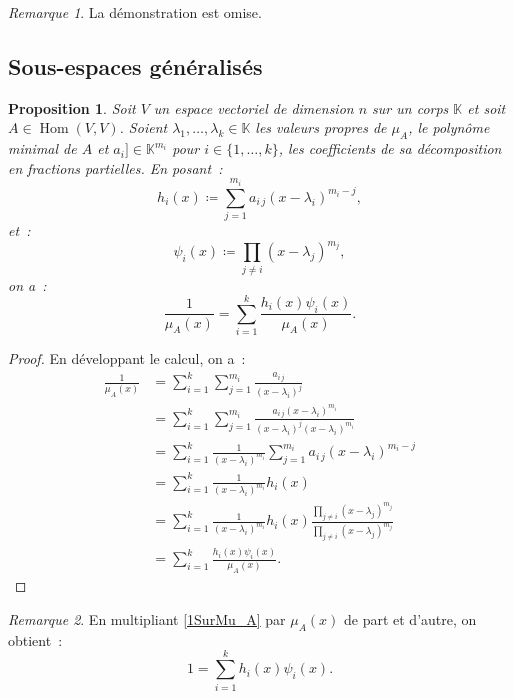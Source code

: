 \documentclass{article}
\DeclareMathOperator{\Hom}{Hom}
\newcommand{\K}{\mathbb K}
\newtheorem{prp}[thm]{Proposition}
\theoremstyle{definition}
\theoremstyle{remark}
\newtheorem*{rmq}{Remarque}
\begin{document}
		\begin{rmq} La démonstration est omise. \end{rmq}
	
	\subsection{Sous-espaces généralisés}
		\begin{prp} Soit $V$ un espace vectoriel de dimension $n$ sur un corps $\K$ et soit $A \in \Hom(V, V)$. Soient $\lambda_1, \dotsc, \lambda_k \in \K$
		les valeurs propres de $\mu_A$, le polynôme minimal de $A$ et $a_i] \in \K^{m_i}$ pour $i \in \{1, \dotsc, k\}$, les coefficients de sa décomposition en
		fractions partielles. En posant~:
		\[h_i(x) \coloneqq \sum_{j=1}^{m_i}a_{i\,j}(x-\lambda_i)^{m_i-j},\]
		et~:
		\[\psi_i(x) \coloneqq \prod_{j \neq i}(x-\lambda_j)^{m_j},\]
		on a~:
		\begin{equation}\label{1SurMu_A}
			\frac 1{\mu_A(x)} = \sum_{i=1}^k\frac {h_i(x)\psi_i(x)}{\mu_A(x)}.
		\end{equation}
		\end{prp}

		\begin{proof} En développant le calcul, on a~:
		\[
			\begin{aligned}
			\frac 1{\mu_A(x)} &= \sum_{i=1}^k\sum_{j=1}^{m_i}\frac {a_{i\,j}}{(x-\lambda_i)^j} \\
			                  &= \sum_{i=1}^k\sum_{j=1}^{m_i}\frac {a_{i\,j}(x-\lambda_i)^{m_i}}{(x-\lambda_i)^j(x-\lambda_i)^{m_i}} \\
			                  &= \sum_{i=1}^k\frac 1{(x-\lambda_i)^{m_i}}\sum_{j=1}^{m_i}a_{i\,j}(x-\lambda_i)^{m_i-j} \\
			                  &= \sum_{i=1}^k\frac 1{(x-\lambda_i)^{m_i}}h_i(x) \\
			                  &= \sum_{i=1}^k\frac 1{(x-\lambda_i)^{m_i}}h_i(x)\frac {\prod_{j \neq i}(x-\lambda_j)^{m_j}}{\prod_{j \neq i}(x-\lambda_j)^{m_j}} \\
			                  &= \sum_{i=1}^k\frac {h_i(x)\psi_i(x)}{\mu_A(x)}.
			\end{aligned}
		\]
		\end{proof}

		\begin{rmq} En multipliant \eqref{1SurMu_A} par $\mu_A(x)$ de part et d'autre, on obtient~:
		\begin{equation}\label{h_iPsi_i=1}
			1 = \sum_{i=1}^kh_i(x)\psi_i(x).
		\end{equation}
		\end{rmq}
\end{document}
